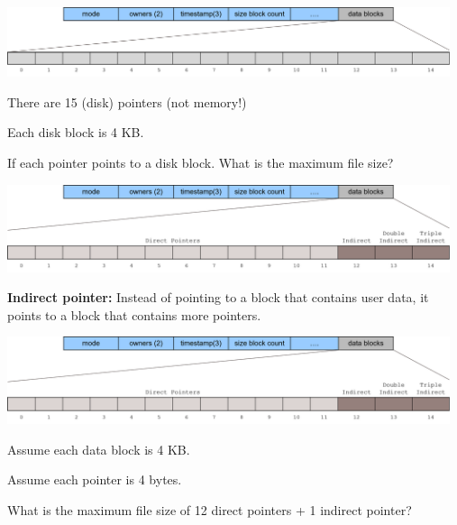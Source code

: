 \begin{slide}

    
    \medskip
    \includegraphics[width=130mm]{inode-struct.png}
    \bigskip

    There are 15 (disk) pointers (not memory!)
    \bigskip

    Each disk block is 4 KB.
    \bigskip

    If each pointer points to a disk block. What is the maximum file size?
\end{slide}

\begin{slide}


    \includegraphics[width=130mm]{inode-struct-2.png}
    \bigskip

    \textbf{Indirect pointer:} Instead of pointing to a block that contains user data, it points to a block that contains more pointers.
    \bigskip

\end{slide}

\begin{slide}


    \includegraphics[width=130mm]{inode-struct-2.png}
    \bigskip

    Assume each data block is 4 KB.

    Assume each pointer is 4 bytes.
    \bigskip

    What is the maximum file size of 12 direct pointers + 1 indirect pointer?

\end{slide}

